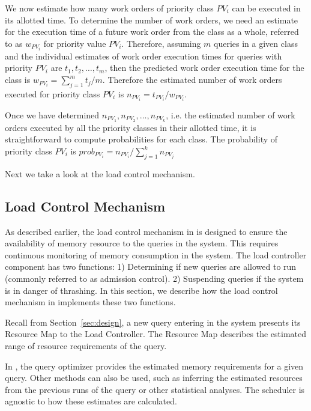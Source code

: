 We now estimate how many work orders of priority class $PV_{i}$ can be executed
in its allotted time. 
To determine the number of work orders, we need an estimate for the execution time 
of a future work order from the class as a whole, referred to as $w_{PV_{i}}$ for priority value $PV_{i}$.
Therefore, assuming $m$ queries in a given class and the individual estimates of 
work order execution times for queries with priority $PV_{i}$ are $t_{1}, t_{2}, \ldots, t_{m}$, then the predicted work order execution time for the class is $w_{PV_{i}} = \sum\limits_{j = 1}^{m}t_{j}/m$.
Therefore the estimated number of work orders executed for priority class $PV_{i}$ is
$n_{PV_{i}} = t_{PV_{i}} / w_{PV_{i}}$.

Once we have determined $n_{PV_{1}}, n_{PV_{2}}, \ldots, n_{PV_{k}}$, i.e. the 
estimated number of work orders executed by all the priority classes in their allotted
time, it is straightforward to compute probabilities for each class. 
The probability of priority class $PV_{i}$ is 
$prob_{PV_{i}} = n_{PV_{i}}/\sum\limits_{j = 1}^{k}n_{PV_{j}}$

Next we take a look at the load control mechanism. %
\subsection{Load Control Mechanism}\label{ssec:load-control-mech}
As described earlier, the load control mechanism in \sys{} is designed to ensure the availability of memory resource to the queries in the system.
This requires continuous monitoring of memory consumption in the system.
The load controller component has two functions:
1) Determining if new queries are allowed to run (commonly referred to as admission control).
2) Suspending queries if the system is in danger of thrashing.
In this section, we describe how the load control mechanism in \sys{} implements these two functions.

Recall from Section~\ref{sec:design}, a new query entering in the system presents its Resource Map to the Load Controller. 
The Resource Map describes the estimated range of resource requirements of the query.

In \sys{}, the query optimizer provides the estimated memory requirements for a given query.
Other methods can also be used, such as inferring the estimated resources from the previous runs of the
query or other statistical analyses.
The scheduler is %
agnostic to how these estimates are calculated.

